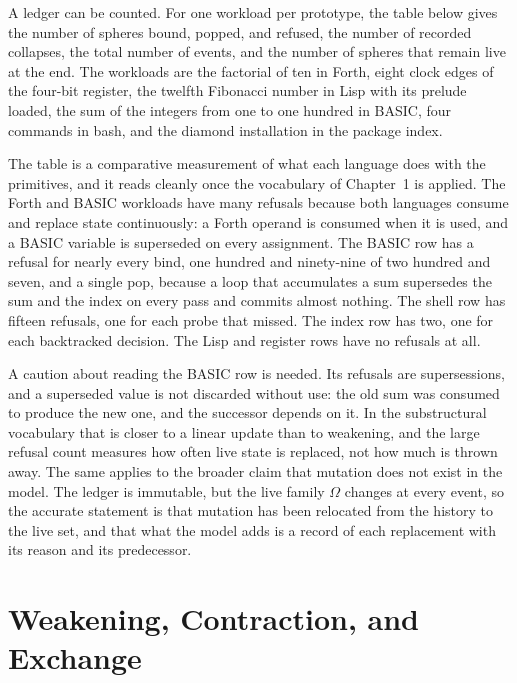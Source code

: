 A ledger can be counted. For one workload per prototype, the table below gives the number of spheres bound, popped, and refused, the number of recorded collapses, the total number of events, and the number of spheres that remain live at the end. The workloads are the factorial of ten in Forth, eight clock edges of the four-bit register, the twelfth Fibonacci number in Lisp with its prelude loaded, the sum of the integers from one to one hundred in BASIC, four commands in bash, and the diamond installation in the package index.

\begin{table}[h]
\centering

\caption{Event counts and live spheres at the end of one workload per prototype.}
\end{table}

The table is a comparative measurement of what each language does with the primitives, and it reads cleanly once the vocabulary of Chapter~1 is applied. The Forth and BASIC workloads have many refusals because both languages consume and replace state continuously: a Forth operand is consumed when it is used, and a BASIC variable is superseded on every assignment. The BASIC row has a refusal for nearly every bind, one hundred and ninety-nine of two hundred and seven, and a single pop, because a loop that accumulates a sum supersedes the sum and the index on every pass and commits almost nothing. The shell row has fifteen refusals, one for each probe that missed. The index row has two, one for each backtracked decision. The Lisp and register rows have no refusals at all.

A caution about reading the BASIC row is needed. Its refusals are supersessions, and a superseded value is not discarded without use: the old sum was consumed to produce the new one, and the successor depends on it. In the substructural vocabulary that is closer to a linear update than to weakening, and the large refusal count measures how often live state is replaced, not how much is thrown away. The same applies to the broader claim that mutation does not exist in the model. The ledger is immutable, but the live family $\Omega$ changes at every event, so the accurate statement is that mutation has been relocated from the history to the live set, and that what the model adds is a record of each replacement with its reason and its predecessor.

\section{Weakening, Contraction, and Exchange}

